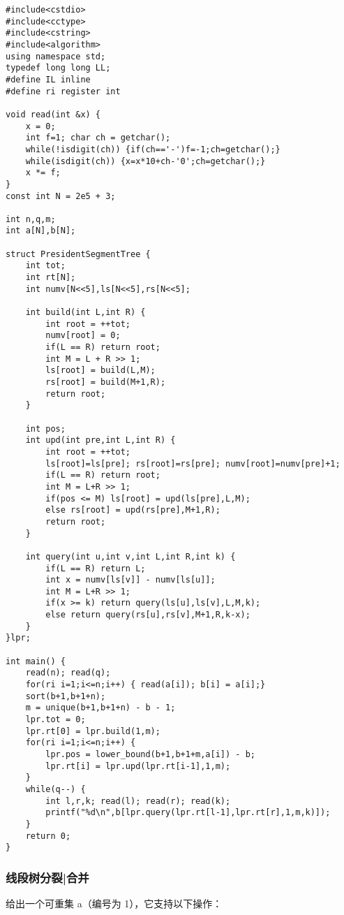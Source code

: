\documentclass[UTF8]{ctexart}
\begin{document}
\begin{framed}
\begin{lstlisting}
#include<cstdio>
#include<cctype>
#include<cstring>
#include<algorithm>
using namespace std;
typedef long long LL;
#define IL inline
#define ri register int

void read(int &x) {
    x = 0;
    int f=1; char ch = getchar();
    while(!isdigit(ch)) {if(ch=='-')f=-1;ch=getchar();}
    while(isdigit(ch)) {x=x*10+ch-'0';ch=getchar();}
    x *= f;
}
const int N = 2e5 + 3;

int n,q,m;
int a[N],b[N];

struct PresidentSegmentTree {
    int tot;
    int rt[N];
    int numv[N<<5],ls[N<<5],rs[N<<5];
    
    int build(int L,int R) {
        int root = ++tot;
        numv[root] = 0;
        if(L == R) return root;
        int M = L + R >> 1;
        ls[root] = build(L,M);
        rs[root] = build(M+1,R);
        return root;
    }
    
    int pos;
    int upd(int pre,int L,int R) {
        int root = ++tot;
        ls[root]=ls[pre]; rs[root]=rs[pre]; numv[root]=numv[pre]+1;
        if(L == R) return root;
        int M = L+R >> 1;
        if(pos <= M) ls[root] = upd(ls[pre],L,M);
        else rs[root] = upd(rs[pre],M+1,R);
        return root;
    }
    
    int query(int u,int v,int L,int R,int k) {
        if(L == R) return L;
        int x = numv[ls[v]] - numv[ls[u]];
        int M = L+R >> 1;
        if(x >= k) return query(ls[u],ls[v],L,M,k);
        else return query(rs[u],rs[v],M+1,R,k-x);
    }
}lpr;

int main() {
    read(n); read(q);
    for(ri i=1;i<=n;i++) { read(a[i]); b[i] = a[i];}
    sort(b+1,b+1+n);
    m = unique(b+1,b+1+n) - b - 1;
    lpr.tot = 0;
    lpr.rt[0] = lpr.build(1,m);
    for(ri i=1;i<=n;i++) {
        lpr.pos = lower_bound(b+1,b+1+m,a[i]) - b;
        lpr.rt[i] = lpr.upd(lpr.rt[i-1],1,m);
    }
    while(q--) {
        int l,r,k; read(l); read(r); read(k);
        printf("%d\n",b[lpr.query(lpr.rt[l-1],lpr.rt[r],1,m,k)]);
    }
    return 0;
}
\end{lstlisting}
\end{framed}

\subsubsection{线段树分裂|合并}
给出一个可重集 a（编号为 1），它支持以下操作：
\end{document}

